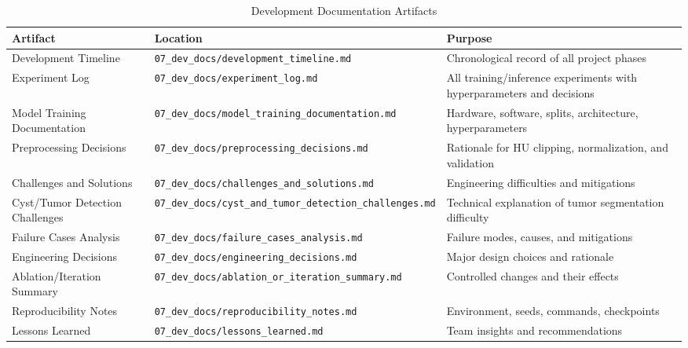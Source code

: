 
\begin{table}[!t]
\caption{Development Documentation Artifacts}
\label{tab:dev_artifacts}
\centering
\begin{tabular}{@{}llp{5cm}@{}}
\toprule
\textbf{Artifact} & \textbf{Location} & \textbf{Purpose} \\
\midrule
Development Timeline & \texttt{07\_dev\_docs/development\_timeline.md} & Chronological record of all project phases \\
Experiment Log & \texttt{07\_dev\_docs/experiment\_log.md} & All training/inference experiments with hyperparameters and decisions \\
Model Training Documentation & \texttt{07\_dev\_docs/model\_training\_documentation.md} & Hardware, software, splits, architecture, hyperparameters \\
Preprocessing Decisions & \texttt{07\_dev\_docs/preprocessing\_decisions.md} & Rationale for HU clipping, normalization, and validation \\
Challenges and Solutions & \texttt{07\_dev\_docs/challenges\_and\_solutions.md} & Engineering difficulties and mitigations \\
Cyst/Tumor Detection Challenges & \texttt{07\_dev\_docs/cyst\_and\_tumor\_detection\_challenges.md} & Technical explanation of tumor segmentation difficulty \\
Failure Cases Analysis & \texttt{07\_dev\_docs/failure\_cases\_analysis.md} & Failure modes, causes, and mitigations \\
Engineering Decisions & \texttt{07\_dev\_docs/engineering\_decisions.md} & Major design choices and rationale \\
Ablation/Iteration Summary & \texttt{07\_dev\_docs/ablation\_or\_iteration\_summary.md} & Controlled changes and their effects \\
Reproducibility Notes & \texttt{07\_dev\_docs/reproducibility\_notes.md} & Environment, seeds, commands, checkpoints \\
Lessons Learned & \texttt{07\_dev\_docs/lessons\_learned.md} & Team insights and recommendations \\
\bottomrule
\end{tabular}
\end{table}
